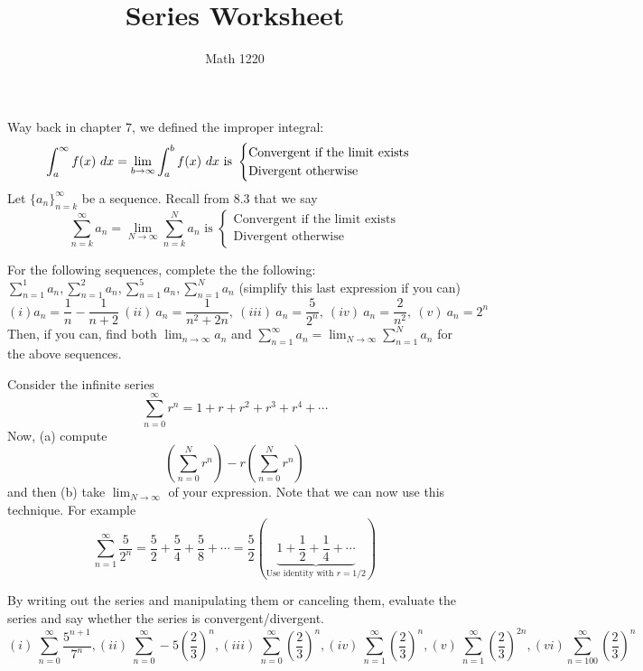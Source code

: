 \documentclass[12pt, a4paper]{article}
\author{Math 1220}
\title{Series Worksheet}
\date{}
\begin{document}
\maketitle
\nameline
\vspace{-0.5in}
\begin{defi}
  Way back in chapter \(7\), we defined the improper integral:
  \[ \int_a^\infty f(x) \ d x = \lim_{b \to \infty} \int_a^b f(x) \ d x
    \text{ is }
    \begin{cases}
      \text{Convergent if the limit exists}\\
      \text{Divergent otherwise}
    \end{cases}
  \]
  Let \(\{a_n\}_{n=k}^\infty\) be a sequence. Recall from \(8.3\) that
  we say
  \[ \sum_{n=k}^\infty a_n = \lim_{N \to \infty} \sum_{n=k}^N a_n
    \text{ is }
    \begin{cases}
      \text{Convergent if the limit exists}\\
      \text{Divergent otherwise}
    \end{cases}
  \]
\end{defi}
\vspace{-1.4in}
\begin{ex}
  For the following sequences, complete the the following: \(
  \sum_{n=1}^1 a_n, \sum_{n=1}^2 a_n, \sum_{n=1}^5 a_n, \sum_{n=1}^N
  a_n\) (simplify this last expression if you can) \[
    (i) a_n = \frac{1}{n}-\frac{1}{n+2} \ (ii)\ a_n = \frac{1}{n^2+2n}, \ (iii)\ a_n = \frac{5}{2^n}, \ (iv)\
    a_n = \frac{2}{n^2}, \ (v)\ a_n = 2^n
  \]
  Then, if you can, find both \(\lim_{n \to \infty} a_n\) and
  \(\sum_{n=1}^\infty a_n = \lim_{N \to \infty} 
  \sum_{n=1}^N a_n\) for 
  the above sequences.
\end{ex}
\vspace{-2.5in}
\begin{ex}
  Consider the infinite series \[
    \sum_{n=0}^\infty r^n = 1+r+r^2+r^3+r^4+\cdots
  \]
  Now, (a) compute \[
    \left( \sum_{n=0}^N r^n \right) - r \left( \sum_{n=0}^N r^n \right)
  \]
  and then (b) take \(\lim_{N \to \infty}\) of your expression. Note
  that we can now use this technique. For example \[
    \sum_{n=1}^\infty \frac{5}{2^n} = \frac{5}{2} + \frac{5}{4} +
    \frac{5}{8} + \cdots = \frac{5}{2}\left(
      \underbrace{1+\frac{1}{2}+\frac{1}{4}+\cdots}_{\text{Use
          identity with }r=1/2} \right)
  \]
\end{ex}
\vspace{-2.2in}
\begin{ex}
  By writing out the series and manipulating them or canceling them,
  evaluate the series and say whether the series is
  convergent/divergent.\[
    (i)\ \sum_{n=0}^\infty \frac{5^{n+1}}{7^n}, (ii)\
    \sum_{n=0}^\infty -5 \left(\frac{2}{3}\right)^n, (iii)\
    \sum_{n=0}^\infty \left( \frac{2}{3} \right)^n, (iv)\
    \sum_{n=1}^\infty \left( \frac{2}{3} \right)^n, (v)\
    \sum_{n=1}^\infty \left( \frac{2}{3} \right)^{2n}, (vi)
    \sum_{n=100}^\infty \left( \frac{2}{3} \right)^n 
  \]
\end{ex}
\end{document}
